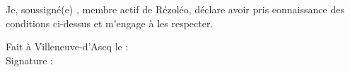 \documentclass[11pt, a4paper]{article}
\begin{document}
\vspace*{0.5cm}

\noindent Je, soussigné(e) \makebox[75mm]{\dotfill}, membre actif de Rézoléo,
déclare avoir pris connaissance des conditions ci-dessus et m'engage à les respecter.

\vspace*{0.5cm}

\begin{flushright}
	\begin{minipage}{0.5\linewidth}
		Fait à Villeneuve-d'Ascq le : \dotfill\\
		Signature :
	\end{minipage}
\end{flushright}
\end{document}
